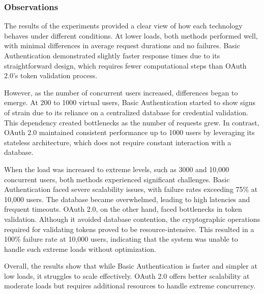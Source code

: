 \begin{table}[h!]
\centering
{}
\caption{Scalability Test Results for 3000 Virtual Users}
\label{tab:scalability-results}
\end{table}

\subsubsection*{Observations}
The results of the experiments provided a clear view of how each technology behaves under different conditions. At lower loads, both methods performed well, with minimal differences in average request durations and no failures. Basic Authentication demonstrated slightly faster response times due to its straightforward design, which requires fewer computational steps than OAuth 2.0’s token validation process.

However, as the number of concurrent users increased, differences began to emerge. At 200 to 1000 virtual users, Basic Authentication started to show signs of strain due to its reliance on a centralized database for credential validation. This dependency created bottlenecks as the number of requests grew. In contrast, OAuth 2.0 maintained consistent performance up to 1000 users by leveraging its stateless architecture, which does not require constant interaction with a database.

When the load was increased to extreme levels, such as 3000 and 10,000 concurrent users, both methods experienced significant challenges. Basic Authentication faced severe scalability issues, with failure rates exceeding 75\% at 10,000 users. The database became overwhelmed, leading to high latencies and frequent timeouts. OAuth 2.0, on the other hand, faced bottlenecks in token validation. Although it avoided database contention, the cryptographic operations required for validating tokens proved to be resource-intensive. This resulted in a 100\% failure rate at 10,000 users, indicating that the system was unable to handle such extreme loads without optimization.

Overall, the results show that while Basic Authentication is faster and simpler at low loads, it struggles to scale effectively. OAuth 2.0 offers better scalability at moderate loads but requires additional resources to handle extreme concurrency.

